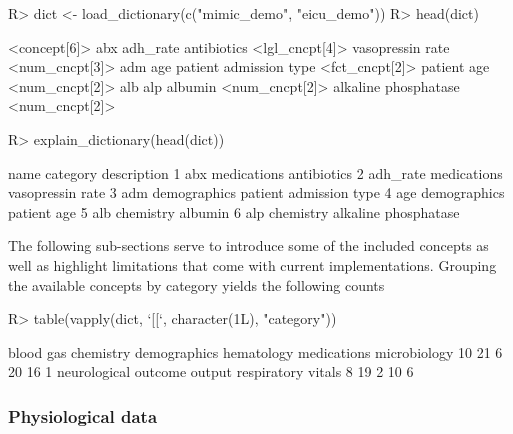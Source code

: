 \documentclass[
  notitle]{jss}
\begin{document}
\begin{CodeChunk}
\begin{CodeInput}
R> dict <- load_dictionary(c("mimic_demo", "eicu_demo"))
R> head(dict)
\end{CodeInput}
\begin{CodeOutput}
<concept[6]>
                                  abx                              adh_rate 
           antibiotics <lgl_cncpt[4]>       vasopressin rate <num_cncpt[3]> 
                                  adm                                   age 
patient admission type <fct_cncpt[2]>            patient age <num_cncpt[2]> 
                                  alb                                   alp 
               albumin <num_cncpt[2]>   alkaline phosphatase <num_cncpt[2]> 
\end{CodeOutput}
\begin{CodeInput}
R> explain_dictionary(head(dict))
\end{CodeInput}
\begin{CodeOutput}
      name     category            description
1      abx  medications            antibiotics
2 adh_rate  medications       vasopressin rate
3      adm demographics patient admission type
4      age demographics            patient age
5      alb    chemistry                albumin
6      alp    chemistry   alkaline phosphatase
\end{CodeOutput}
\end{CodeChunk}

The following sub-sections serve to introduce some of the included
concepts as well as highlight limitations that come with current
implementations. Grouping the available concepts by category yields the
following counts

\begin{CodeChunk}
\begin{CodeInput}
R> table(vapply(dict, `[[`, character(1L), "category"))
\end{CodeInput}
\begin{CodeOutput}

   blood gas    chemistry demographics   hematology  medications microbiology 
          10           21            6           20           16            1 
neurological      outcome       output  respiratory       vitals 
           8           19            2           10            6 
\end{CodeOutput}
\end{CodeChunk}

\hypertarget{physiological-data}{%
\subsubsection{Physiological data}\label{physiological-data}}
\end{document}
